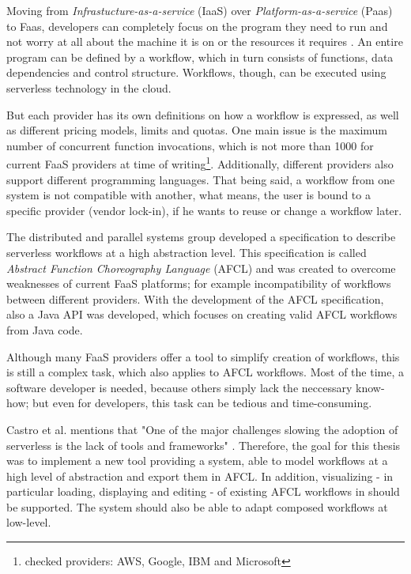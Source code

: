 \documentclass[a4paper,12pt,pdftex,halfparskip,cleardoubleempty,bibtotoc,liststotoc]{scrbook}
\begin{document}
Moving from \emph{Infrastucture-as-a-service} (IaaS) over \emph{Platform-as-a-service} (Paas) to Faas, developers can completely focus on the program they need to run and not worry at all about the machine it is on or the resources it requires \cite{articles-going-serverless-savage}.
An entire program can be defined by a workflow, which in turn consists of functions, data dependencies and control structure. Workflows, though, can be executed using serverless technology in the cloud.

But each provider has its own definitions on how a workflow is expressed, as well as different pricing models, limits and quotas. One main issue is the maximum number of concurrent function invocations, which is not more than 1000  for current FaaS providers at time of writing\footnote{checked providers: AWS, Google, IBM and Microsoft}.
Additionally, different providers also support different programming languages. That being said, a workflow from one system is not compatible with another, what means, the user is bound to a specific provider (vendor lock-in), if he wants to reuse or change a workflow later.

\newpage

The distributed and parallel systems group developed a specification to describe serverless workflows at a high abstraction level. This specification is called \emph{Abstract Function Choreography Language} (AFCL) and was created to overcome weaknesses  of current FaaS platforms; for example incompatibility of workflows between different providers. With the development of the AFCL specification, also a Java API was developed, which focuses on creating valid AFCL workflows from Java code.

Although many FaaS providers offer a tool to simplify creation of workflows, this is still a complex task, which also applies to AFCL workflows. Most of the time, a software developer is needed, because others simply lack the neccessary know-how; but even for developers, this task can be tedious and time-consuming.

Castro et al. mentions that "One of the major challenges slowing the adoption of serverless is the lack of tools and frameworks" \cite{articles-rise-of-serverless-castro}.
Therefore, the goal for this thesis was to implement a new tool providing a system, able to model workflows at a high level of abstraction and export them in AFCL. In addition, visualizing - in particular loading, displaying and editing - of existing AFCL workflows in should be supported.
The system should also be able to adapt composed workflows at low-level.
\end{document}
